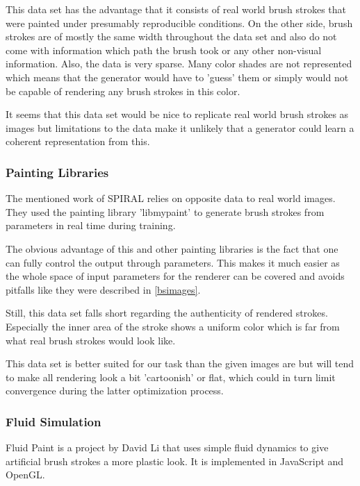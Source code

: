 This data set has the advantage that it consists of real world brush strokes that
were painted under presumably reproducible conditions.
On the other side, brush strokes are of mostly the same width throughout the data set
and also do not come with information which path the brush took or any other non-visual
information.
Also, the data is very sparse.
Many color shades are not represented which means that the generator would have to
'guess' them or simply would not be capable of rendering any brush strokes in this color.

It seems that this data set would be nice to replicate real world brush strokes
as images but limitations to the data make it unlikely that a generator could learn
a coherent representation from this.

\subsubsection{Painting Libraries}

The mentioned work of SPIRAL \cite{SPIRAL} relies on opposite data to real world
images.
They used the painting library 'libmypaint' \cite{libmypaint} to generate brush strokes
from parameters in real time during training.

The obvious advantage of this and other painting libraries is the fact that one
can fully control the output through parameters.
This makes it much easier as the whole space of input parameters for the renderer
can be covered and avoids pitfalls like they were described in \ref{bsimages}.

Still, this data set falls short regarding the authenticity of rendered strokes.
Especially the inner area of the stroke shows a uniform color which is far from
what real brush strokes would look like.

This data set is better suited for our task than the given images are but will tend
to make all rendering look a bit 'cartoonish' or flat, which could in turn limit
convergence during the latter optimization process.

\subsubsection{Fluid Simulation}

Fluid Paint is a project by David Li \cite{fluidpaint} that uses simple
fluid dynamics to give artificial brush strokes a more plastic look.
It is implemented in JavaScript and OpenGL.

